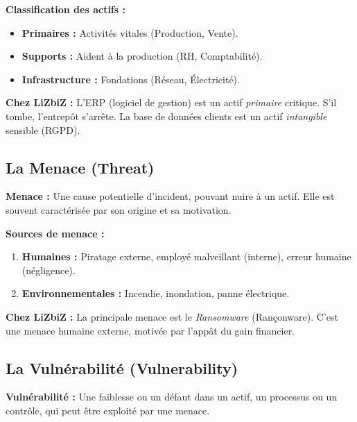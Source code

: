 \textbf{Classification des actifs :}
\begin{itemize}
    \item \textbf{Primaires :} Activités vitales (Production, Vente).
    \item \textbf{Supports :} Aident à la production (RH, Comptabilité).
    \item \textbf{Infrastructure :} Fondations (Réseau, Électricité).
\end{itemize}

\begin{boxlizbiz}
\textbf{Chez LiZbiZ :}
L'ERP (logiciel de gestion) est un actif \textit{primaire} critique. S'il tombe, l'entrepôt s'arrête. La base de données clients est un actif \textit{intangible} sensible (RGPD).
\end{boxlizbiz}

\subsection{La Menace (Threat)}

\begin{boxdef}
\textbf{Menace :} Une cause potentielle d'incident, pouvant nuire à un actif. Elle est souvent caractérisée par son origine et sa motivation.
\end{boxdef}

\textbf{Sources de menace :}
\begin{enumerate}
    \item \textbf{Humaines :} Piratage externe, employé malveillant (interne), erreur humaine (négligence).
    \item \textbf{Environnementales :} Incendie, inondation, panne électrique.
\end{enumerate}

\begin{boxlizbiz}
\textbf{Chez LiZbiZ :} La principale menace est le \textit{Ransomware} (Rançonware). C'est une menace humaine externe, motivée par l'appât du gain financier.
\end{boxlizbiz}

\subsection{La Vulnérabilité (Vulnerability)}

\begin{boxdef}
\textbf{Vulnérabilité :} Une faiblesse ou un défaut dans un actif, un processus ou un contrôle, qui peut être exploité par une menace.
\end{boxdef}

